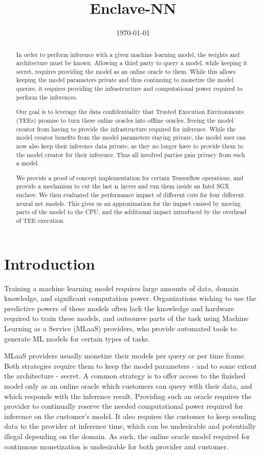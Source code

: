 \documentclass[11pt,twocolumn]{article}
\date{\today}
\title{Enclave-NN}
\begin{document}
\maketitle

\begin{abstract}
In order to perform inference with a given machine learning model, the weights and architecture must be known.
Allowing a third party to query a model, while keeping it secret, requires providing the model as an online oracle to them.
While this allows keeping the model parameters private and thus continuing to monetize the model queries, it requires providing the infrastructure and computational power required to perform the inferences.

Our goal is to leverage the data confidentiality that Trusted Execution Environments (TEEs) promise to turn these online oracles into offline oracles, freeing the model creator from having to provide the infrastructure required for inference.
While the model creator benefits from the model parameters staying private, the model user can now also keep their inference data private, as they no longer have to provide them to the model creator for their inference.
Thus all involved parties gain privacy from such a model.

We provide a proof of concept implementation for certain Tensorflow operations, and provide a mechanism to cut the last \($n$\) layers and run them inside an Intel SGX enclave.
We then evaluated the performance impact of different cuts for four different neural net models.
This gives us an approximation for the impact caused by moving parts of the model to the CPU, and the additional impact introduced by the overhead of TEE execution.
\end{abstract}

\section{Introduction}
\label{sec:introduction}

Training a machine learning model requires large amounts of data, domain knowledge, and significant computation power.
Organizations wishing to use the predictive powers of these models often lack the knowledge and hardware required to train these models, and outsource parts of the task using Machine Learning as a Service (MLaaS) providers, who provide automated tools to generate ML models for certain types of tasks.

MLaaS providers usually monetize their models per query or per time frame.
Both strategies require them to keep the model parameters - and to some extent the architecture - secret.
A common strategy is to offer access to the finished model only as an online oracle which customers can query with their data, and which responds with the inference result.
Providing such an oracle requires the provider to continually reserve the needed computational power required for inference on the customer's model.
It also requires the customer to keep sending data to the provider at inference time, which can be undesirable and potentially illegal depending on the domain.
As such, the online oracle model required for continuous monetization is undesirable for both provider and customer.
\end{document}
